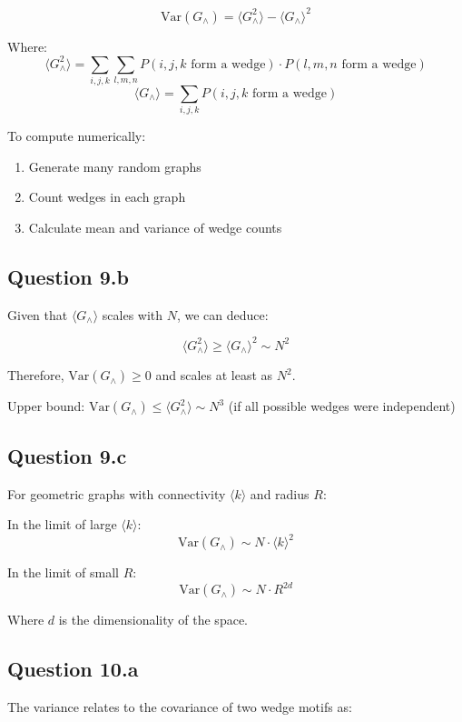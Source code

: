 \documentclass{article}
\begin{document}
\[
\text{Var}(G_{\wedge}) = \langle G_{\wedge}^2 \rangle - \langle G_{\wedge} \rangle^2
\]

Where:
\[
\langle G_{\wedge}^2 \rangle = \sum_{i,j,k} \sum_{l,m,n} P(i,j,k \text{ form a wedge}) \cdot P(l,m,n \text{ form a wedge})
\]
\[
\langle G_{\wedge} \rangle = \sum_{i,j,k} P(i,j,k \text{ form a wedge})
\]

To compute numerically:
\begin{enumerate}
\item Generate many random graphs
\item Count wedges in each graph
\item Calculate mean and variance of wedge counts
\end{enumerate}

\subsection{Question 9.b}

Given that \( \langle G_{\wedge} \rangle \) scales with \( N \), we can deduce:

\[
\langle G_{\wedge}^2 \rangle \geq \langle G_{\wedge} \rangle^2 \sim N^2
\]

Therefore, \(\text{Var}(G_{\wedge}) \geq 0\) and scales at least as \( N^2 \).

Upper bound: \(\text{Var}(G_{\wedge}) \leq \langle G_{\wedge}^2 \rangle \sim N^3\) (if all possible wedges were independent)

\subsection{Question 9.c}

For geometric graphs with connectivity \( \langle k \rangle \) and radius \( R \):

In the limit of large \( \langle k \rangle \): 
\[
\text{Var}(G_{\wedge}) \sim N \cdot \langle k \rangle^2
\]

In the limit of small \( R \):
\[
\text{Var}(G_{\wedge}) \sim N \cdot R^{2d}
\]

Where \( d \) is the dimensionality of the space.

\subsection{Question 10.a}

The variance relates to the covariance of two wedge motifs as:
\end{document}
